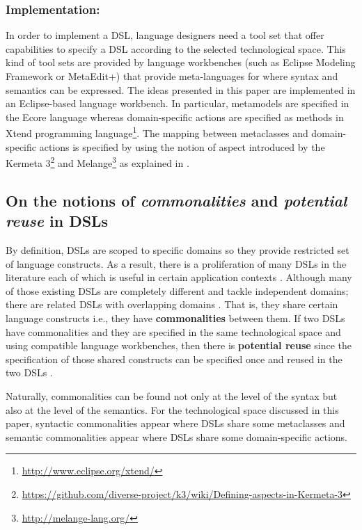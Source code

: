 \vspace{-2mm}
\subsubsection{Implementation:} In order to implement a DSL, language designers need a tool set that offer capabilities to specify a DSL according to the selected technological space. This kind of tool sets are provided by language workbenches (such as Eclipse Modeling Framework or MetaEdit+) that provide meta-languages for where syntax and semantics can be expressed. The ideas presented in this paper are implemented in an Eclipse-based language workbench. In particular, metamodels are specified in the Ecore language whereas domain-specific actions are specified as methods in Xtend programming language\footnote{\url{http://www.eclipse.org/xtend/}}. The mapping between metaclasses and domain-specific actions is specified by using the notion of aspect introduced by the Kermeta 3\footnote{\url{https://github.com/diverse-project/k3/wiki/Defining-aspects-in-Kermeta-3}} and Melange\footnote{\url{http://melange-lang.org/}} as explained in \cite{degueule:2015}. 

\subsection{On the notions of \textit{commonalities} and \textit{potential reuse} in DSLs}

By definition, DSLs are scoped to specific domains so they provide restricted set of language constructs. As a result, there is a proliferation of many DSLs in the literature each of which is useful in certain application contexts \cite{Mernik:2005b}. Although many of those existing DSLs are completely different and tackle independent domains; there are related DSLs with overlapping domains \cite[p. 60-61]{voelter:2013}. That is, they share certain language constructs i.e., they have \textbf{commonalities} between them. If two DSLs have commonalities and they are specified in the same technological space and using compatible language workbenches, then there is \textbf{potential reuse} since the specification of those shared constructs can be specified once and reused in the two DSLs \cite[p. 60-61]{voelter:2013}.

Naturally, commonalities can be found not only at the level of the syntax but also at the level of the semantics. For the technological space discussed in this paper, syntactic commonalities appear where DSLs share some metaclasses and semantic commonalities appear where DSLs share some domain-specific actions.

